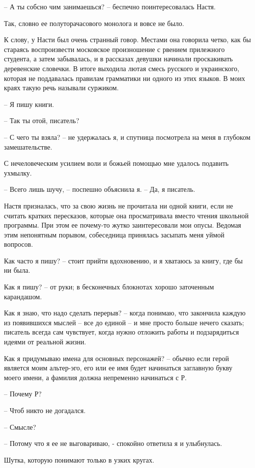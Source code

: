 \documentclass[
]{book}
\begin{document}
-- А ты собсно чим занимаешься? -- беспечно поинтересовалась Настя.

Так, словно ее полуторачасового монолога и вовсе не было.

К слову, у Насти был очень странный говор. Местами она говорила четко, как бы стараясь воспроизвести московское произношение с рвением прилежного студента, а затем забывалась, и в рассказах девушки начинали проскакивать деревенские словечки. В итоге выходила лютая смесь русского и украинского, которая не поддавалась правилам грамматики ни одного из этих языков. В моих краях такую речь называли суржиком.

-- Я пишу книги.

-- Так ты отой, писатель?

-- С чего ты взяла? -- не удержалась я, и спутница посмотрела на меня в глубоком замешательстве.

С нечеловеческим усилием воли и божьей помощью мне удалось подавить ухмылку.

-- Всего лишь шучу, -- поспешно объяснила я. -- Да, я писатель.

Настя призналась, что за свою жизнь не прочитала ни одной книги, если не считать кратких пересказов, которые она просматривала вместо чтения школьной программы. При этом ее почему-то жутко заинтересовали мои опусы. Ведомая этим непонятным порывом, собеседница принялась засыпать меня уймой вопросов.

Как часто я пишу? -- стоит прийти вдохновению, и я хватаюсь за книгу, где бы ни была.

Как я пишу? -- от руки; в бесконечных блокнотах хорошо заточенным карандашом.

Как я знаю, что надо сделать перерыв? -- когда понимаю, что закончила каждую из появившихся мыслей -- все до единой -- и мне просто больше нечего сказать; писатель всегда сам чувствует, когда нужно отложить работы и подзарядиться идеями от реальной жизни.

Как я придумываю имена для основных персонажей? -- обычно если герой является моим альтер-эго, его или ее имя будет начинаться заглавную букву моего имени, а фамилия должна непременно начинаться с Р.

-- Почему Р?

-- Чтоб никто не догадался.

-- Смысле?

-- Потому что я ее не выговариваю, - спокойно ответила я и улыбнулась.

Шутка, которую понимают только в узких кругах.
\end{document}
